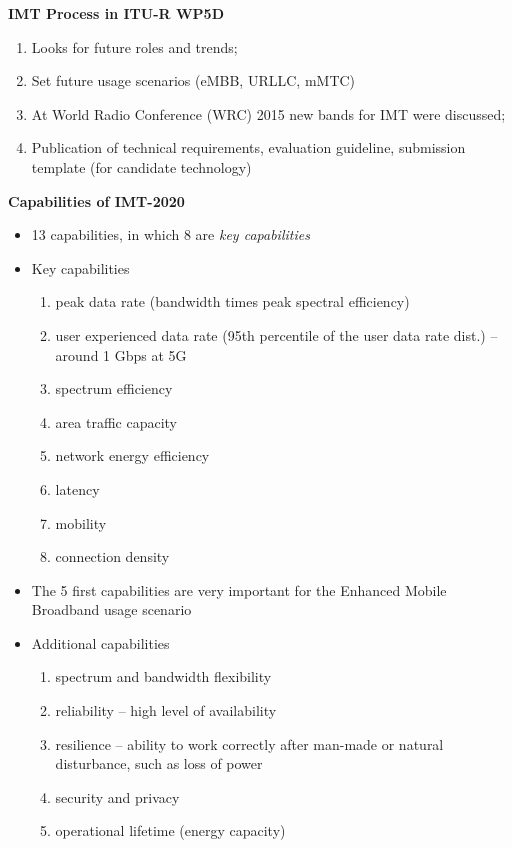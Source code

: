 \documentclass{beamer}
\begin{document}
\begin{frame}[allowframebreaks]
		\textbf{IMT Process in ITU-R WP5D}
		\begin{enumerate}
			\item Looks for future roles and trends;
			\item Set future usage scenarios (eMBB, URLLC, mMTC)
			\item At World Radio Conference (WRC) 2015 new bands for IMT were discussed;
			\item Publication of technical requirements, evaluation guideline, submission template (for candidate technology)
		\end{enumerate}
	
		\textbf{Capabilities of IMT-2020}
		\begin{itemize}
			\item 13 capabilities, in which 8 are \emph{key capabilities}
			\item Key capabilities
			\begin{enumerate}
				\item peak data rate (bandwidth times peak spectral efficiency)
				\item user experienced data rate (95th percentile of the user data rate dist.) -- around 1 Gbps at 5G
				\item spectrum efficiency
				\item area traffic capacity
				\item network energy efficiency
				\item latency
				\item mobility
				\item connection density
			\end{enumerate}
			\item The 5 first capabilities are very important for the Enhanced Mobile Broadband usage scenario
			\item Additional capabilities
			\begin{enumerate}
				\item spectrum and bandwidth flexibility
				\item reliability -- high level of availability
				\item resilience -- ability to work correctly after man-made or natural disturbance, such as loss of power
				\item security and privacy
				\item operational lifetime (energy capacity)
			\end{enumerate}
		\end{itemize}
	

\end{frame}
\end{document}
